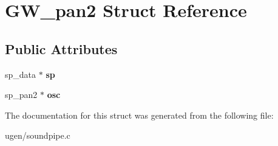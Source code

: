 \hypertarget{structGW__pan2}{}\section{G\+W\+\_\+pan2 Struct Reference}
\label{structGW__pan2}
\subsection*{Public Attributes}
\begin{DoxyCompactItemize}
\item 
\hypertarget{structGW__pan2_ac5112810b8daefb8d1466ae0e8bf7ec4}{}\label{structGW__pan2_ac5112810b8daefb8d1466ae0e8bf7ec4} 
sp\+\_\+data $\ast$ {\bfseries sp}
\item 
\hypertarget{structGW__pan2_afef6817cffb6e95b6943762fe9866446}{}\label{structGW__pan2_afef6817cffb6e95b6943762fe9866446} 
sp\+\_\+pan2 $\ast$ {\bfseries osc}
\end{DoxyCompactItemize}


The documentation for this struct was generated from the following file\+:\begin{DoxyCompactItemize}
\item 
ugen/soundpipe.\+c\end{DoxyCompactItemize}
